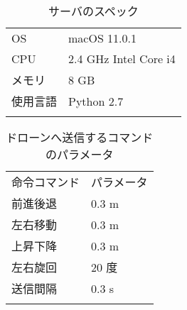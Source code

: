 \documentclass[submit]{ipsj}
\begin{document}

\begin{table}[tb]
  \caption{サーバのスペック}
  \label{tab:server_spec}
  \centering
  \begin{tabular}{ll}
  \noalign{\smallskip}\hline\noalign{\smallskip}
    OS     & macOS 11.0.1       \\
    CPU     & 2.4 GHz Intel Core i4       \\
    メモリ     & 8 GB       \\ 
    使用言語     & Python 2.7       \\
    \noalign{\smallskip}\hline
  \end{tabular}
\end{table}

\begin{table}[tb]
  \caption{ドローンへ送信するコマンドのパラメータ}
  \label{tab:command_parameter}
  \centering
  \begin{tabular}{ll}
    \hline\noalign{\smallskip}
    命令コマンド &  パラメータ       \\
    \noalign{\smallskip}\hline\noalign{\smallskip}
    前進後退     & 0.3 m       \\
    左右移動     & 0.3 m       \\
    上昇下降     & 0.3 m       \\
    左右旋回     & 20 度       \\
    送信間隔     & 0.3 s       \\
    \noalign{\smallskip}\hline
  \end{tabular}
\end{table}


\end{document}
